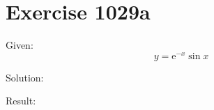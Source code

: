 \documentclass[a4paper, 10pt]{scrartcl}
\newcommand*\euler{\mathrm{e}}
\begin{document}
\section{Exercise 1029a}

Given:
\[
y = \euler^{-x}\sin{x}
\]

Solution:

Result:
\end{document}
